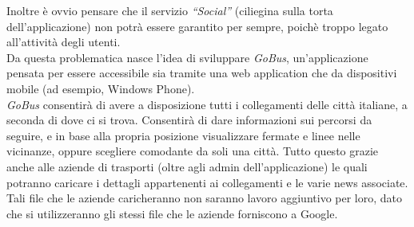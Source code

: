 Inoltre \`{e} ovvio pensare che il servizio \emph{``Social''} (ciliegina sulla torta  dell\rq applicazione) non potr\`{a} essere garantito per sempre, poich\`{e} troppo legato all\rq attivit\`{a} degli utenti.\\
Da questa problematica nasce l\rq idea di sviluppare \emph{GoBus}, un\rq applicazione pensata per essere accessibile sia tramite una web application che da dispositivi mobile (ad esempio, Windows Phone).\\
\emph{GoBus} consentir\`{a} di avere a disposizione tutti i collegamenti delle citt\`{a} italiane, a seconda di dove ci si trova. Consentir\`{a} di dare informazioni sui percorsi da seguire, e in base alla propria posizione visualizzare fermate e linee nelle vicinanze, oppure scegliere comodante da soli una citt\`{a}.
Tutto questo grazie anche alle aziende di trasporti (oltre agli admin dell\rq applicazione) le quali potranno caricare i dettagli appartenenti ai collegamenti e le varie news associate. Tali file che le aziende caricheranno non saranno lavoro aggiuntivo per loro, dato che si utilizzeranno gli stessi file che le aziende forniscono a Google.